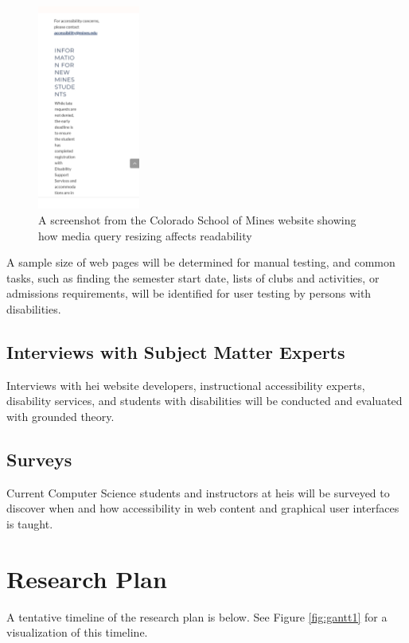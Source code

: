 \documentclass{article}
\begin{document}
\begin{figure}[h]
    \centering
    \includegraphics[width=0.3\textwidth]{Screenshot_20220111-161636.png}
    \caption{A screenshot from the Colorado School of Mines website showing how media query resizing affects readability}
    \label{fig:csm}
\end{figure}

A sample size of web pages will be determined for manual testing, and common tasks, such as finding the semester start date, lists of clubs and activities, or admissions requirements, will be identified for user testing by persons with disabilities.

\subsection{Interviews with Subject Matter Experts}

Interviews with \acrshort{hei} website developers, instructional accessibility experts, disability services, and students with disabilities will be conducted and evaluated with grounded theory. 

\subsection{Surveys}

Current Computer Science students and instructors at \acrshort{heis} will be surveyed to discover when and how accessibility in web content and graphical user interfaces is taught. 

\section{Research Plan}

A tentative timeline of the research plan is below. See Figure \ref{fig:gantt1} for a visualization of this timeline.
\end{document}

